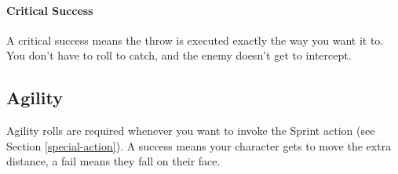 \paragraph{Critical Success} A critical success means the throw is executed exactly the way you want it to. You don't have to roll to catch, and the enemy doesn't get to intercept.

\subsection{Agility}
Agility rolls are required whenever you want to invoke the Sprint action (see Section \ref{special-action}). A success means your character gets to move the extra distance, a fail means they fall on their face.